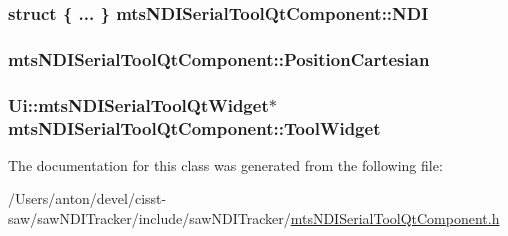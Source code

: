 \subsubsection[{N\+D\+I}]{\setlength{\rightskip}{0pt plus 5cm}struct \{ ... \}   mts\+N\+D\+I\+Serial\+Tool\+Qt\+Component\+::\+N\+D\+I\hspace{0.3cm}{\ttfamily [protected]}}\label{classmts_n_d_i_serial_tool_qt_component_a5373227414bb34244a6bf26aa8405e21}
\hypertarget{classmts_n_d_i_serial_tool_qt_component_aeeeb01caede4ad7c1b9861e6b5325941}{}
\subsubsection[{Position\+Cartesian}]{ mts\+N\+D\+I\+Serial\+Tool\+Qt\+Component\+::\+Position\+Cartesian}\label{classmts_n_d_i_serial_tool_qt_component_aeeeb01caede4ad7c1b9861e6b5325941}
\hypertarget{classmts_n_d_i_serial_tool_qt_component_af967ad37bf503470a35cb6fd9b6bd247}{}
\subsubsection[{Tool\+Widget}]{\setlength{\rightskip}{0pt plus 5cm}Ui\+::mts\+N\+D\+I\+Serial\+Tool\+Qt\+Widget$\ast$ mts\+N\+D\+I\+Serial\+Tool\+Qt\+Component\+::\+Tool\+Widget\hspace{0.3cm}{\ttfamily [protected]}}\label{classmts_n_d_i_serial_tool_qt_component_af967ad37bf503470a35cb6fd9b6bd247}


The documentation for this class was generated from the following file\+:\begin{DoxyCompactItemize}
\item 
/\+Users/anton/devel/cisst-\/saw/saw\+N\+D\+I\+Tracker/include/saw\+N\+D\+I\+Tracker/\hyperlink{mts_n_d_i_serial_tool_qt_component_8h}{mts\+N\+D\+I\+Serial\+Tool\+Qt\+Component.\+h}\end{DoxyCompactItemize}
